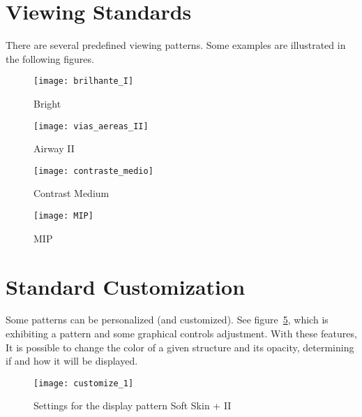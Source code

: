 \section{Viewing Standards}

There are several predefined viewing patterns. Some examples are illustrated in the following figures. 

\begin{figure}[!htb]
\centering
\texttt{[image: brilhante\_I]}
\caption{Bright}
\label{fig:brilhante_I}
\end{figure}

\begin{figure}[!htb]
\centering 
\texttt{[image: vias\_aereas\_II]}
\caption{Airway II}
\label{fig:vias_aereas_II} 
\end{figure}

\begin{figure}[!htb]
\centering
\texttt{[image: contraste\_medio]}
\caption{Contrast Medium}
\label{fig:contraste_medio}
\end{figure}

\begin{figure}[!htb]
\centering
\texttt{[image: MIP]}
\caption{MIP}
\label{fig:MIP}
\end{figure}


\newpage


\section{Standard Customization}

Some patterns can be personalized (and customized). See figure~\ref{fig:customize_1}, which is exhibiting a pattern and some graphical controls adjustment. With these features, It is possible to change the color of a given structure and its opacity, determining if and how it will be displayed.

\begin{figure}[!htb]
\centering
\texttt{[image: customize\_1]}
\caption{Settings for the display pattern Soft Skin + II}
\label{fig:customize_1}
\end{figure}


